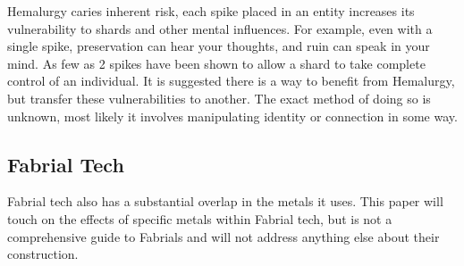 \documentclass[conference]{IEEEtran}
\begin{document}
Hemalurgy caries inherent risk, each spike placed in an entity increases its vulnerability to shards and other mental influences.  For example, even with a single spike, preservation can hear your thoughts, and ruin can speak in your mind.  As few as 2 spikes have been shown to allow a shard to take complete control of an individual.  It is suggested there is a way to benefit from Hemalurgy, but transfer these vulnerabilities to another.  The exact method of doing so is unknown, most likely it involves manipulating identity or connection in some way.
\subsection*{Fabrial Tech}
Fabrial tech also has a substantial overlap in the metals it uses.  This paper will touch on the effects of specific metals within Fabrial tech, but is not a comprehensive guide to Fabrials and will not address anything else about their construction.
\end{document}

